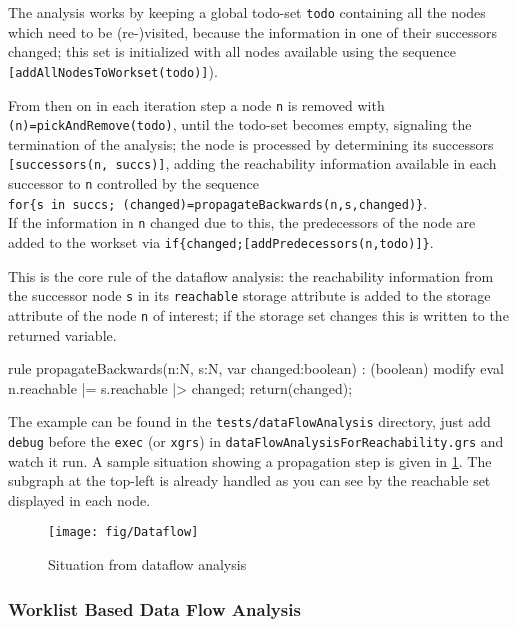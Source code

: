 The analysis works by keeping a global todo-set \verb#todo# containing all the nodes which need to be (re-)visited,
because the information in one of their successors changed;
this set is initialized with all nodes available using the sequence \verb#[addAllNodesToWorkset(todo)]#).

From then on in each iteration step a node \verb#n# is removed with \verb#(n)=pickAndRemove(todo)#, until the todo-set becomes empty, signaling the termination of the analysis; the node is processed by determining its successors \verb#[successors(n, succs)]#, adding the reachability information available in each successor to \verb#n# controlled by the sequence\\
\verb#for{s in succs; (changed)=propagateBackwards(n,s,changed)}#.\\
If the information in \verb#n# changed due to this, the predecessors of the node are added to the workset via \verb#if{changed;[addPredecessors(n,todo)]}#.

  \begin{example}
This is the core rule of the dataflow analysis: the reachability information from the successor node \texttt{s} in its \texttt{reachable} storage attribute is added to the storage attribute of the node \texttt{n} of interest; if the storage set changes this is written to the returned variable.
    \begin{grgen}
rule propagateBackwards(n:N, s:N, var changed:boolean) : (boolean)
{
  modify {
    eval { n.reachable |= s.reachable |> changed; }
    return(changed);
  }
}
    \end{grgen}
  \end{example}

The example can be found in the \texttt{tests/dataFlowAnalysis} directory, just add \texttt{debug} before the \texttt{exec} (or \texttt{xgrs}) in \texttt{dataFlowAnalysisForReachability.grs} and watch it run.
A sample situation showing a propagation step is given in \ref{figdataflow}.
The subgraph at the top-left is already handled as you can see by the reachable set displayed in each node.

\begin{figure}[htbp]
  \centering
  \texttt{[image: fig/Dataflow]}
  \caption{Situation from dataflow analysis}
  \label{figdataflow}
\end{figure}

\subsubsection*{Worklist Based Data Flow Analysis}

